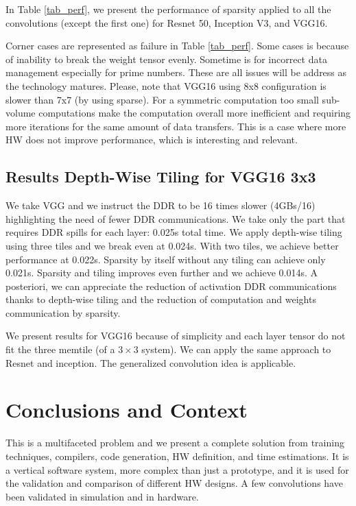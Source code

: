 \documentclass{IEEEtran}
\begin{document}
In Table \ref{tab_perf}, we present the performance of sparsity
applied to all the convolutions (except the first one) for Resnet 50,
Inception V3, and VGG16.

Corner cases are represented as failure in Table \ref{tab_perf}. Some
cases is because of inability to break the weight tensor evenly.
Sometime is for incorrect data management especially for prime
numbers. These are all issues will be address as the technology
matures. Please, note that VGG16 using 8x8 configuration is slower
than 7x7 (by using sparse).  For a symmetric computation too small
sub-volume computations make the computation overall more inefficient
and requiring more iterations for the same amount of data
transfers. This is a case where more HW does not improve performance,
which is interesting and relevant.

\subsection{Results Depth-Wise Tiling for VGG16 3x3}
\label{sec:res-depth}

We take VGG and we instruct the DDR to be 16 times slower (4GBs/16)
highlighting the need of fewer DDR communications. We take only the
part that requires DDR spills for each layer: 0.025s total time.  We
apply depth-wise tiling using three tiles and we break even at
0.024s. With two tiles, we achieve better performance at
0.022s. Sparsity by itself without any tiling can achieve only
0.021s. Sparsity and tiling improves even further and we achieve
0.014s. A posteriori, we can appreciate the reduction of activation
DDR communications thanks to depth-wise tiling and the reduction of
computation and weights communication by sparsity.

We present results for VGG16 because of simplicity and each layer
tensor do not fit the three memtile (of a $3\times 3$ system). We can
apply the same approach to Resnet and inception. The generalized
convolution idea is applicable.


\section{Conclusions and Context}
This is a multifaceted problem and we present a complete solution from
training techniques, compilers, code generation, HW definition, and
time estimations. It is a vertical software system, more complex than
just a prototype, and it is used for the validation and comparison of
different HW designs. A few convolutions have been validated in
simulation and in hardware.
\end{document}
